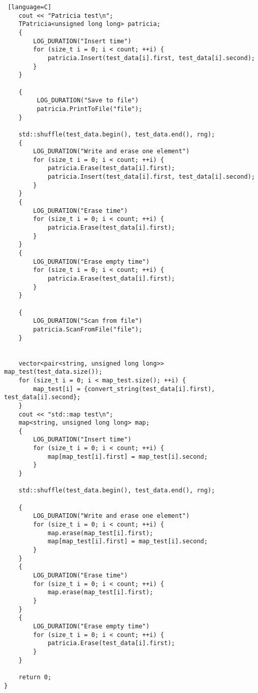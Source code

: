 \begin{lstlisting} [language=C]
    cout << "Patricia test\n";
    TPatricia<unsigned long long> patricia;
    {
        LOG_DURATION("Insert time")
        for (size_t i = 0; i < count; ++i) {
            patricia.Insert(test_data[i].first, test_data[i].second);
        }
    }

    {
         LOG_DURATION("Save to file")
         patricia.PrintToFile("file");
    }

    std::shuffle(test_data.begin(), test_data.end(), rng);
    {
        LOG_DURATION("Write and erase one element")
        for (size_t i = 0; i < count; ++i) {
            patricia.Erase(test_data[i].first);
            patricia.Insert(test_data[i].first, test_data[i].second);
        }
    }
    {
        LOG_DURATION("Erase time")
        for (size_t i = 0; i < count; ++i) {
            patricia.Erase(test_data[i].first);
        }
    }
    {
        LOG_DURATION("Erase empty time")
        for (size_t i = 0; i < count; ++i) {
            patricia.Erase(test_data[i].first);
        }
    }

    {
        LOG_DURATION("Scan from file")
        patricia.ScanFromFile("file");
    }


    vector<pair<string, unsigned long long>> map_test(test_data.size());
    for (size_t i = 0; i < map_test.size(); ++i) {
        map_test[i] = {convert_string(test_data[i].first), test_data[i].second};
    }
    cout << "std::map test\n";
    map<string, unsigned long long> map;
    {
        LOG_DURATION("Insert time")
        for (size_t i = 0; i < count; ++i) {
            map[map_test[i].first] = map_test[i].second;
        }
    }

    std::shuffle(test_data.begin(), test_data.end(), rng);

    {
        LOG_DURATION("Write and erase one element")
        for (size_t i = 0; i < count; ++i) {
            map.erase(map_test[i].first);
            map[map_test[i].first] = map_test[i].second;
        }
    }
    {
        LOG_DURATION("Erase time")
        for (size_t i = 0; i < count; ++i) {
            map.erase(map_test[i].first);
        }
    }
    {
        LOG_DURATION("Erase empty time")
        for (size_t i = 0; i < count; ++i) {
            patricia.Erase(test_data[i].first);
        }
    }

    return 0;
}

\end{lstlisting}


